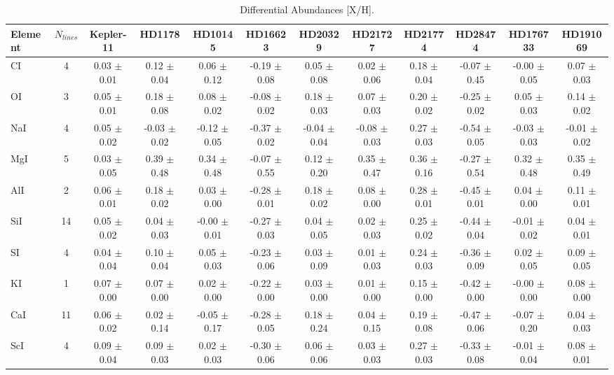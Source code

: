 \documentclass[oneside]{emulateapj}
\begin{document}
\pagebreak


\begin{table}
\caption{Differential Abundances [X/H].}
\label{tbl:abund}
\begin{tabular}{lccccccccccc} 
\hline    
\hline 
{Element} & $N_{lines}$ & Kepler-11 & HD1178 & HD10145 & HD16623 & HD20329 & HD21727 & HD21774 & HD28474 & HD176733 & HD191069 \\
\hline
CI & 4 & 0.03 $\pm$ 0.01 & 0.12 $\pm$ 0.04 & 0.06 $\pm$ 0.12 & -0.19 $\pm$ 0.08 & 0.05 $\pm$ 0.08 & 0.02 $\pm$ 0.06 & 0.18 $\pm$ 0.04 & -0.07 $\pm$ 0.45 & -0.00 $\pm$ 0.05 & 0.07 $\pm$ 0.03 \\
OI & 3 & 0.05 $\pm$ 0.01 & 0.18 $\pm$ 0.08 & 0.08 $\pm$ 0.02 & -0.08 $\pm$ 0.02 & 0.18 $\pm$ 0.03 & 0.07 $\pm$ 0.03 & 0.20 $\pm$ 0.02 & -0.25 $\pm$ 0.02 & 0.05 $\pm$ 0.03 & 0.14 $\pm$ 0.02 \\
NaI & 4 & 0.05 $\pm$ 0.02 & -0.03 $\pm$ 0.02 & -0.12 $\pm$ 0.05 & -0.37 $\pm$ 0.02 & -0.04 $\pm$ 0.04 & -0.08 $\pm$ 0.03 & 0.27 $\pm$ 0.03 & -0.54 $\pm$ 0.05 & -0.03 $\pm$ 0.03 & -0.01 $\pm$ 0.02 \\
MgI & 5 & 0.03 $\pm$ 0.05 & 0.39 $\pm$ 0.48 & 0.34 $\pm$ 0.48 & -0.07 $\pm$ 0.55 & 0.12 $\pm$ 0.20 & 0.35 $\pm$ 0.47 & 0.36 $\pm$ 0.16 & -0.27 $\pm$ 0.54 & 0.32 $\pm$ 0.48 & 0.35 $\pm$ 0.49 \\
AlI & 2 & 0.06 $\pm$ 0.01 & 0.18 $\pm$ 0.02 & 0.03 $\pm$ 0.00 & -0.28 $\pm$ 0.01 & 0.18 $\pm$ 0.02 & 0.08 $\pm$ 0.00 & 0.28 $\pm$ 0.01 & -0.45 $\pm$ 0.01 & 0.04 $\pm$ 0.00 & 0.11 $\pm$ 0.01 \\
SiI & 14 & 0.05 $\pm$ 0.02 & 0.04 $\pm$ 0.03 & -0.00 $\pm$ 0.01 & -0.27 $\pm$ 0.03 & 0.04 $\pm$ 0.05 & 0.02 $\pm$ 0.03 & 0.25 $\pm$ 0.02 & -0.44 $\pm$ 0.04 & -0.01 $\pm$ 0.02 & 0.04 $\pm$ 0.01 \\
SI & 4 & 0.04 $\pm$ 0.04 & 0.10 $\pm$ 0.04 & 0.05 $\pm$ 0.03 & -0.23 $\pm$ 0.06 & 0.03 $\pm$ 0.09 & 0.01 $\pm$ 0.03 & 0.24 $\pm$ 0.03 & -0.36 $\pm$ 0.09 & 0.02 $\pm$ 0.05 & 0.09 $\pm$ 0.05 \\
KI & 1 & 0.07 $\pm$ 0.00 & 0.07 $\pm$ 0.00 & 0.02 $\pm$ 0.00 & -0.22 $\pm$ 0.00 & 0.03 $\pm$ 0.00 & 0.01 $\pm$ 0.00 & 0.15 $\pm$ 0.00 & -0.42 $\pm$ 0.00 & -0.00 $\pm$ 0.00 & 0.08 $\pm$ 0.00 \\
CaI & 11 & 0.06 $\pm$ 0.02 & 0.02 $\pm$ 0.14 & -0.05 $\pm$ 0.17 & -0.28 $\pm$ 0.05 & 0.18 $\pm$ 0.24 & 0.04 $\pm$ 0.15 & 0.19 $\pm$ 0.08 & -0.47 $\pm$ 0.06 & -0.07 $\pm$ 0.20 & 0.04 $\pm$ 0.03 \\
ScI & 4 & 0.09 $\pm$ 0.04 & 0.09 $\pm$ 0.03 & 0.02 $\pm$ 0.03 & -0.30 $\pm$ 0.06 & 0.06 $\pm$ 0.06 & 0.03 $\pm$ 0.03 & 0.27 $\pm$ 0.03 & -0.33 $\pm$ 0.08 & -0.01 $\pm$ 0.04 & 0.08 $\pm$ 0.01 \\

\end{tabular}
\end{table}
\end{document}
